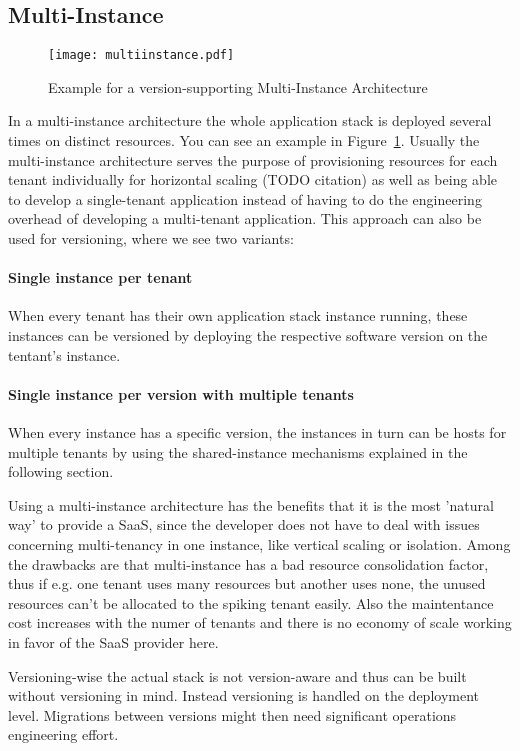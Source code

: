 \subsection{Multi-Instance}

\begin{figure}
\centering
\texttt{[image: multiinstance.pdf]}
\caption{Example for a version-supporting Multi-Instance Architecture}
\label{fig:multiinstance}
\end{figure}

In a multi-instance architecture the whole application stack is deployed several times on distinct resources. You can see an example in Figure~\ref{fig:multiinstance}. Usually the multi-instance architecture serves the purpose of provisioning resources for each tenant individually for horizontal scaling (TODO citation) as well as being able to develop a single-tenant application instead of having to do the engineering overhead of developing a multi-tenant application. This approach can also be used for versioning, where we see two variants:

\paragraph{Single instance per tenant} When every tenant has their own application stack instance running, these instances can be versioned by deploying the respective software version on the tentant's instance.
\paragraph{Single instance per version with multiple tenants} When every instance has a specific version, the instances in turn can be hosts for multiple tenants by using the shared-instance mechanisms explained in the following section.

Using a multi-instance architecture has the benefits that it is the most 'natural way' to provide a SaaS, since the developer does not have to deal with issues concerning multi-tenancy in one instance, like vertical scaling or isolation. Among the drawbacks are that multi-instance has a bad resource consolidation factor, thus if e.g. one tenant uses many resources but another uses none, the unused resources can't be allocated to the spiking tenant easily. Also the maintentance cost increases with the numer of tenants and there is no economy of scale working in favor of the SaaS provider here.

Versioning-wise the actual stack is not version-aware and thus can be built without versioning in mind. Instead versioning is handled on the deployment level. Migrations between versions might then need significant operations engineering effort.

